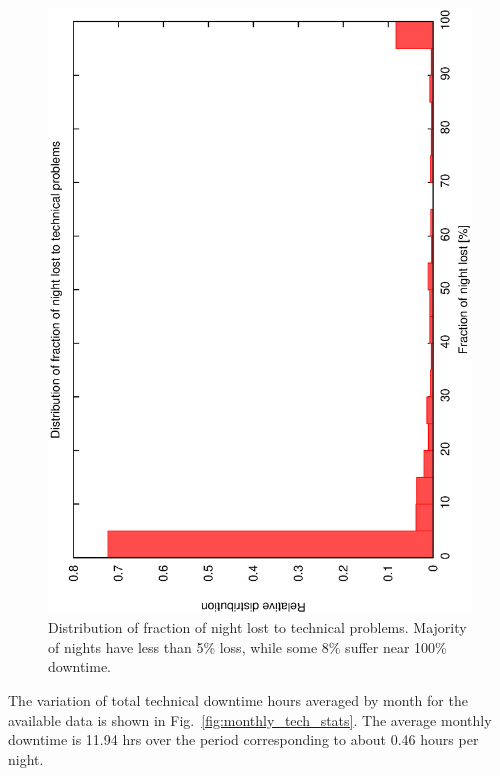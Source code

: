 \begin{figure}[htbp]  
  \begin{center}
    \includegraphics[scale=0.4, angle=-90]{figures/ecs/tech_loss_frac.eps}
  \end{center}
  \caption[Distribution of fraction of night lost to technical problems.]
   {Distribution of fraction of night lost to technical problems. Majority of nights have less than 5\% loss, while some 8\% suffer near 100\% downtime.}
  \label{fig:tech_loss_dist}
\end{figure}

The variation of total technical downtime hours averaged by month for the available data is shown in Fig.~\ref{fig:monthly_tech_stats}. The average monthly downtime is 11.94 hrs over the period corresponding to about 0.46 hours per night.

